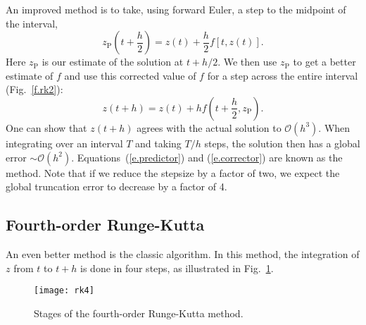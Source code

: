 An improved method is to take, using forward Euler, a step to the midpoint of the interval,
\begin{equation}\label{e.predictor}
z_{\mathrm{P}}\left(t+\frac{h}{2}\right) = z(t) + \frac{h}{2}f[t,z(t)].
\end{equation}
Here $z_{\mathrm{P}}$ is our estimate of the solution at $t+h/2$.
We then use $z_{\mathrm{P}}$ to get a better estimate of $f$ and use this corrected value of $f$ for a step across the entire interval (Fig.~\ref{f.rk2}):
\begin{equation}\label{e.corrector}
z(t+h) = z(t) + h f\left(t+\frac{h}{2},z_{\mathrm{P}}\right).
\end{equation}
One can show that $z(t+h)$ agrees with the actual solution to $\mathcal{O}(h^{3})$. When integrating over an interval $T$ and taking $T/h$ steps, the solution then has a global error $\sim\mathcal{O}(h^{2})$.  Equations~(\ref{e.predictor}) and (\ref{e.corrector}) are known as the  method. Note that if we reduce the stepsize by a factor of two, we expect the global truncation error to decrease by a factor of 4.

\subsection{Fourth-order Runge-Kutta}

An even better method is the classic  algorithm. In this method, the integration of $z$ from $t$ to $t+h$ is done in four steps, as illustrated in Fig.~\ref{f.rk4}.

\begin{figure}
\texttt{[image: rk4]}
\caption[The fourth-order Runge-Kutta method]{\label{f.rk4}
Stages of the fourth-order Runge-Kutta method.}
\end{figure}

